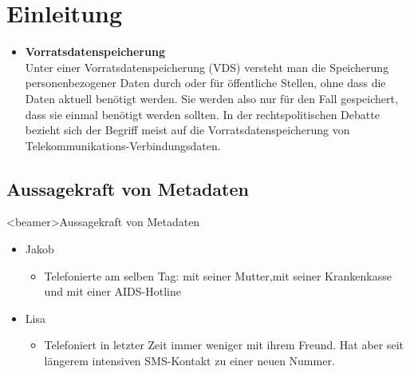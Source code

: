 
\section{Einleitung}
  \begin{frame}
    \begin{itemize}
      \frametitle{Vorratsdatenspeicherung}
      \item \textbf{Vorratsdatenspeicherung}\\
        Unter einer Vorratsdatenspeicherung (VDS) versteht man die Speicherung personenbezogener Daten durch oder für öffentliche Stellen, ohne dass die Daten aktuell benötigt werden. Sie werden also nur für den Fall gespeichert, dass sie einmal benötigt werden sollten. In der rechtspolitischen Debatte bezieht sich der Begriff meist auf die Vorratsdatenspeicherung von Telekommunikations-Verbindungsdaten.
    \end{itemize}
  \end{frame}

  \subsection*{Aussagekraft von Metadaten}
    \begin{frame}<beamer>{Aussagekraft von Metadaten}
      \begin{itemize}
        \item Jakob
           \begin{itemize}
         \item Telefonierte am selben Tag: mit seiner Mutter,mit seiner Krankenkasse und mit einer AIDS-Hotline
      \end{itemize}
        \item Lisa
           \begin{itemize}
         \item Telefoniert in letzter Zeit immer weniger mit ihrem Freund. Hat aber seit längerem intensiven SMS-Kontakt zu einer neuen Nummer.
      \end{itemize}
      \end{itemize}
    \end{frame}
